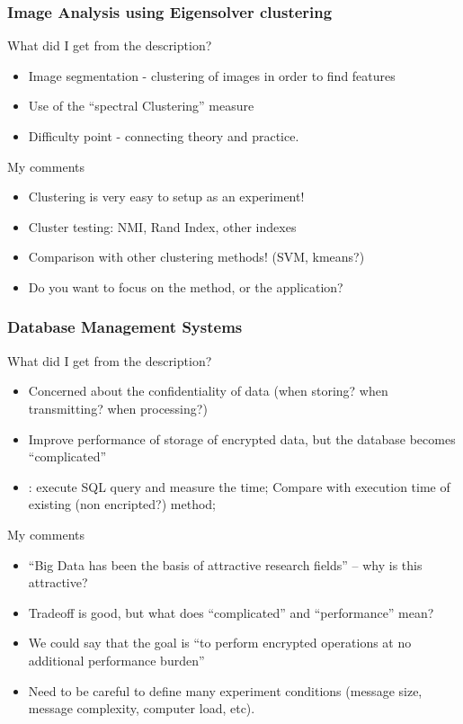 \documentclass[10pt]{beamer}
\begin{document}
\begin{frame}
  \frametitle{Image Analysis using Eigensolver clustering}
  \begin{block}{What did I get from the description?}
    \begin{itemize}
    \item Image segmentation - clustering of images in order to find features
    \item Use of the ``spectral Clustering'' measure
    \item Difficulty point - connecting theory and
      practice. 
    \end{itemize}
  \end{block}
  \begin{block}{My comments}
    \begin{itemize}
    \item Clustering is very easy to setup as an experiment!
    \item Cluster testing: NMI, Rand Index, other indexes
    \item Comparison with other clustering methods! (SVM, kmeans?)
    \item Do you want to focus on the method, or the application?
    \end{itemize}    
  \end{block}
\end{frame}

\begin{frame}
  \frametitle{Database Management Systems}
  \begin{block}{What did I get from the description?}
    \begin{itemize}
    \item Concerned about the confidentiality of data (when storing?
      when transmitting? when processing?)
    \item Improve performance of storage of encrypted data, but the
      database becomes ``complicated''
    \item {}: execute SQL query and measure the
      time; Compare with execution time of existing (non encripted?)
      method;
    \end{itemize}
  \end{block}
  \begin{block}{My comments}
    \begin{itemize}
    \item ``Big Data has been the basis of attractive research fields''
      -- why is this attractive?
    \item Tradeoff is good, but what does ``complicated'' and
      ``performance'' mean?
    \item We could say that the goal is ``to perform encrypted
      operations at no additional performance burden''
    \item Need to be careful to define many experiment conditions
      (message size, message complexity, computer load, etc).
    \end{itemize}
  \end{block}
\end{frame}
\end{document}
